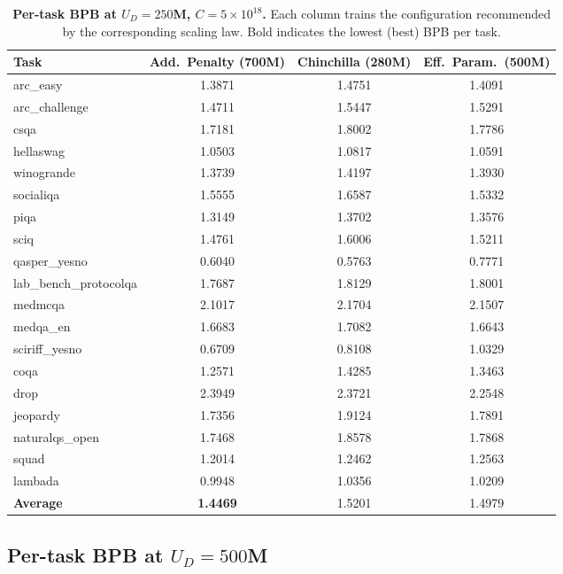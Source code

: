 \begin{table}[t]
    \centering
    \caption{\textbf{Per-task BPB at $U_D = 250$M, $C = 5 \times 10^{18}$.} Each column trains the configuration recommended by the corresponding scaling law. Bold indicates the lowest (best) BPB per task.}
    \label{tab:task_bpb_250m}
    \begin{tabular}{lccc}
        \toprule
        Task & Add.\ Penalty (700M) & Chinchilla (280M) & Eff.\ Param.\ (500M) \\
        \midrule
        arc\_easy & {1.3871} & 1.4751 & 1.4091 \\
        arc\_challenge & {1.4711} & 1.5447 & 1.5291 \\
        csqa & {1.7181} & 1.8002 & 1.7786 \\
        hellaswag & {1.0503} & 1.0817 & 1.0591 \\
        winogrande & {1.3739} & 1.4197 & 1.3930 \\
        socialiqa & 1.5555 & 1.6587 & {1.5332} \\
        piqa & {1.3149} & 1.3702 & 1.3576 \\
        sciq & {1.4761} & 1.6006 & 1.5211 \\
        qasper\_yesno & 0.6040 & {0.5763} & 0.7771 \\
        lab\_bench\_protocolqa & {1.7687} & 1.8129 & 1.8001 \\
        medmcqa & {2.1017} & 2.1704 & 2.1507 \\
        medqa\_en & 1.6683 & 1.7082 & {1.6643} \\
        sciriff\_yesno & {0.6709} & 0.8108 & 1.0329 \\
        \midrule
        coqa & {1.2571} & 1.4285 & 1.3463 \\
        drop & 2.3949 & 2.3721 & {2.2548} \\
        jeopardy & {1.7356} & 1.9124 & 1.7891 \\
        naturalqs\_open & {1.7468} & 1.8578 & 1.7868 \\
        squad & {1.2014} & 1.2462 & 1.2563 \\
        \midrule
        lambada & {0.9948} & 1.0356 & 1.0209 \\
        \midrule
        \textbf{Average} & \textbf{1.4469} & 1.5201 & 1.4979 \\
        \bottomrule
    \end{tabular}
\end{table}

\subsection{Per-task BPB at $U_D = 500$M}

